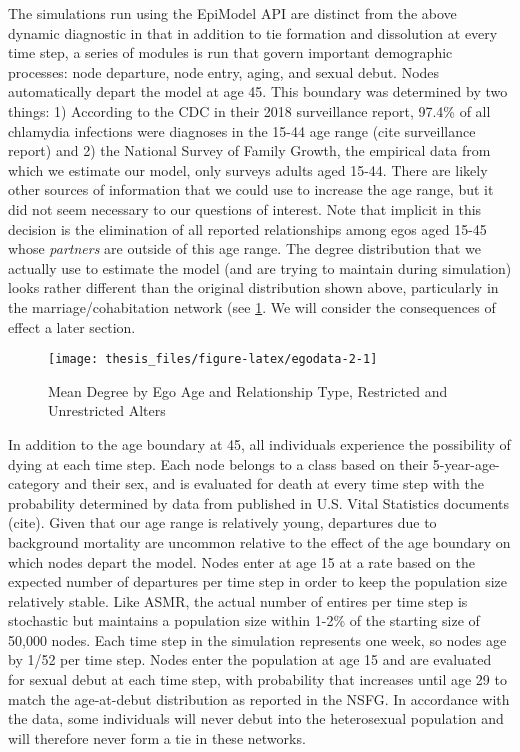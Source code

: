 \documentclass [11pt, proquest] {uwthesis}[2015/03/03]
\begin{document}
The simulations run using the EpiModel API are distinct from the above
dynamic diagnostic in that in addition to tie formation and dissolution
at every time step, a series of modules is run that govern important
demographic processes: node departure, node entry, aging, and sexual
debut. Nodes automatically depart the model at age 45. This boundary was
determined by two things: 1) According to the CDC in their 2018
surveillance report, 97.4\% of all chlamydia infections were diagnoses
in the 15-44 age range (cite surveillance report) and 2) the National
Survey of Family Growth, the empirical data from which we estimate our
model, only surveys adults aged 15-44. There are likely other sources of
information that we could use to increase the age range, but it did not
seem necessary to our questions of interest. Note that implicit in this
decision is the elimination of all reported relationships among egos
aged 15-45 whose \emph{partners} are outside of this age range. The
degree distribution that we actually use to estimate the model (and are
trying to maintain during simulation) looks rather different than the
original distribution shown above, particularly in the
marriage/cohabitation network (see \ref{fig:egodata-2}. We will consider
the consequences of effect a later section.
\begin{figure}

{\centering \texttt{[image: thesis\_files/figure-latex/egodata-2-1]} 

}

\caption{Mean Degree by Ego Age and Relationship Type, Restricted and Unrestricted Alters}\label{fig:egodata-2}
\end{figure}
In addition to the age boundary at 45, all individuals experience the
possibility of dying at each time step. Each node belongs to a class
based on their 5-year-age-category and their sex, and is evaluated for
death at every time step with the probability determined by data from
published in U.S. Vital Statistics documents (cite). Given that our age
range is relatively young, departures due to background mortality are
uncommon relative to the effect of the age boundary on which nodes
depart the model. Nodes enter at age 15 at a rate based on the expected
number of departures per time step in order to keep the population size
relatively stable. Like ASMR, the actual number of entires per time step
is stochastic but maintains a population size within 1-2\% of the
starting size of 50,000 nodes. Each time step in the simulation
represents one week, so nodes age by 1/52 per time step. Nodes enter the
population at age 15 and are evaluated for sexual debut at each time
step, with probability that increases until age 29 to match the
age-at-debut distribution as reported in the NSFG. In accordance with
the data, some individuals will never debut into the heterosexual
population and will therefore never form a tie in these networks.
\end{document}
